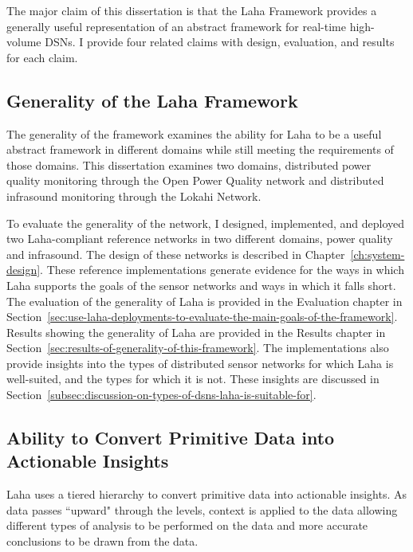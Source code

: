 \begin{tcolorbox}
The major claim of this dissertation is that the Laha Framework provides a generally useful representation of an abstract framework for real-time high-volume DSNs. I provide four related claims with design, evaluation, and results for each claim.
\end{tcolorbox}

\subsection{Generality of the Laha Framework}\label{subsec:generality-of-the-laha-framework}
The generality of the framework examines the ability for Laha to be a useful abstract framework in different domains while still meeting the requirements of those domains. This dissertation examines two domains, distributed power quality monitoring through the Open Power Quality network and distributed infrasound monitoring through the Lokahi Network.

To evaluate the generality of the network, I designed, implemented, and deployed two Laha-compliant reference networks in two different domains, power quality and infrasound. The design of these networks is described in Chapter~\ref{ch:system-design}. These reference implementations generate evidence for the ways in which Laha supports the goals of the sensor networks and ways in which it falls short. The evaluation of the generality of Laha is provided in the Evaluation chapter in Section~\ref{sec:use-laha-deployments-to-evaluate-the-main-goals-of-the-framework}. Results showing the generality of Laha are provided in the Results chapter in Section~\ref{sec:results-of-generality-of-this-framework}. The implementations also provide insights into the types of distributed sensor networks for which Laha is well-suited, and the types for which it is not. These insights are discussed in Section~\ref{subsec:discussion-on-types-of-dsns-laha-is-suitable-for}.

\subsection{Ability to Convert Primitive Data into Actionable Insights}\label{subsec:ability-to-convert-primitive-data-into-actional-insights}
Laha uses a tiered hierarchy to convert primitive data into actionable insights. As data passes ``upward" through the levels, context is applied to the data allowing different types of analysis to be performed on the data and more accurate conclusions to be drawn from the data.

